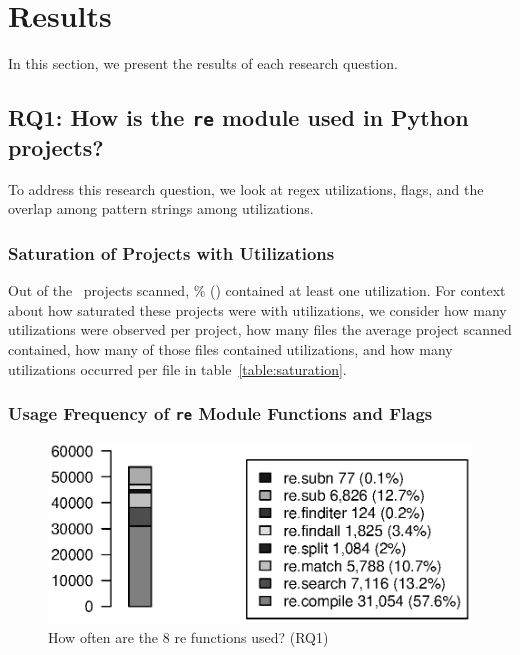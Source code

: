 \section{Results}
\label{sec:results}

In this section, we present the results of each research question. 

\subsection{RQ1: How  is the {\tt re} module used in Python projects?}
To address this research question, we look at regex utilizations, flags, and the overlap among pattern strings among utilizations. 

\subsubsection{Saturation of Projects with Utilizations}
Out of the \ projects scanned, \% () contained at least one utilization.  For context about how saturated these projects were with utilizations, we consider how many utilizations were observed per project, how many files the average project scanned contained, how many of those files contained utilizations, and how many utilizations occurred per file in table~\ref{table:saturation}.



\subsubsection{Usage Frequency of {\tt re} Module Functions and Flags}

\begin{figure}[tb]
\centering
\includegraphics[width=\columnwidth]{../analysis_output/partFunctions.eps}
\caption{How often are the 8 re functions used? (RQ1)}
\label{fig:partFunctions}
\end{figure}

